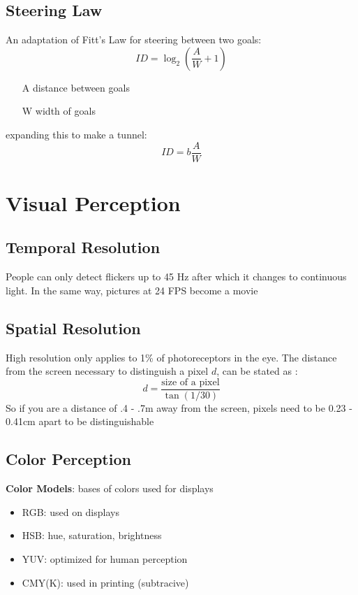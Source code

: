 \documentclass[]{article}
\theoremstyle{definition}
\begin{document}
	\subsection{Steering Law}
	An adaptation of Fitt's Law for steering between two goals:
	\begin{equation*}
		ID = \log_2 (\frac{A}{W} + 1)
	\end{equation*}
	\begin{itemize}
		\item[A] distance between goals
		\item[W] width of goals
	\end{itemize}
	expanding this to make a tunnel:
	\begin{equation*}
		ID = b \frac{A}{W}	
	\end{equation*}

	\section{Visual Perception}
	\subsection{Temporal Resolution}
	People can only detect flickers up to 45 Hz after which it changes to continuous light. 
	In the same way, pictures at 24 FPS become a movie

	\subsection{Spatial Resolution}
	High resolution only applies to 1\% of photoreceptors in the eye.
	The distance from the screen necessary to distinguish a pixel $d$, can be stated as :
	\begin{equation*}
		d = \frac{\text{size of a pixel}}{\tan (1/30)}
	\end{equation*}
	So if you are a distance of .4 - .7m away from the screen, pixels need to be 0.23 - 0.41cm apart to be distinguishable

	\subsection{Color Perception}
	\textbf{Color Models}: bases of colors used for displays
	\begin{itemize}
		\item RGB: used on displays
		\item HSB: hue, saturation, brightness
		\item YUV: optimized for human perception
		\item CMY(K): used in printing (subtracive)
	\end{itemize}
\end{document}
